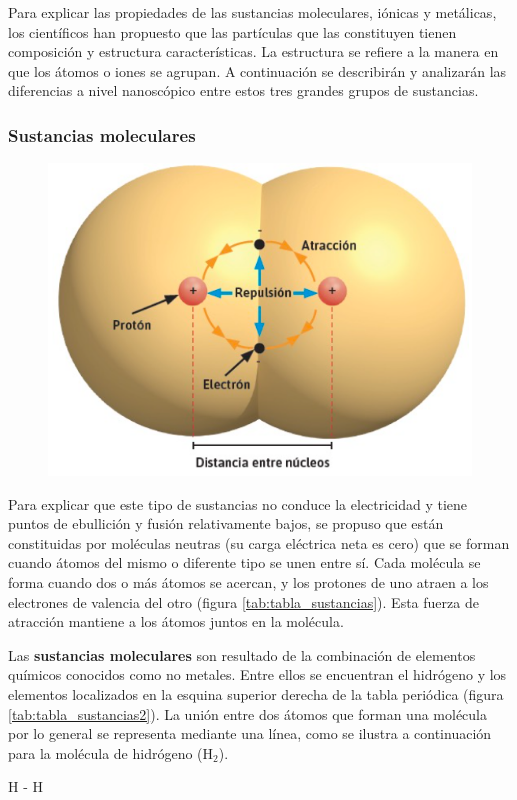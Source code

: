 \documentclass[11pt]{book}
\begin{document}
Para explicar las propiedades de las sustancias moleculares, iónicas y metálicas, los científicos han propuesto
que las partículas que las constituyen tienen composición y estructura características. La estructura se refiere
a la manera en que los átomos o iones se agrupan. A continuación se describirán y analizarán las diferencias a
nivel nanoscópico entre estos tres grandes grupos de sustancias.


\subsubsection{Sustancias moleculares}

\begin{figure}
  \centering
  \includegraphics[width=.4\textwidth]{atraccion_repulsion.png}
  \label{fig:atraccion_repulsion}
\end{figure}

Para explicar que este tipo de sustancias no conduce la electricidad y tiene puntos de
ebullición y fusión relativamente bajos, se propuso que están constituidas por moléculas
neutras (su carga eléctrica neta es cero) que se forman cuando átomos del mismo o diferente
tipo se unen entre sí. Cada molécula se forma cuando dos o más átomos se acercan, y los
protones de uno atraen a los electrones de valencia del otro (figura \ref{tab:tabla_sustancias}). Esta fuerza
de atracción mantiene a los átomos juntos en la molécula.

Las \textbf{sustancias moleculares} son resultado de la combinación de elementos químicos conocidos
como no metales. Entre ellos se encuentran el hidrógeno y los elementos localizados en la
esquina superior derecha de la tabla periódica (figura \ref{tab:tabla_sustancias2}).
La unión entre dos átomos que forman una molécula por lo general se representa mediante
una línea, como se ilustra a continuación para la molécula de hidrógeno (H$_2$).

\begin{center}
  H - H
\end{center}
\end{document}
